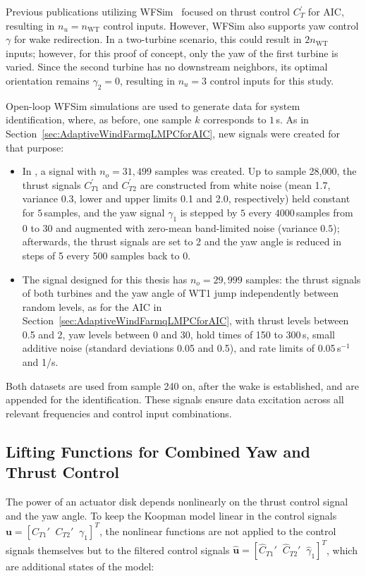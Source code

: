 Previous publications utilizing WFSim~\cite{boersma2017tutorial,doekemeijer2018online, sharan2022Koopman, dittmer2022data} focused on thrust control $C_T^{\prime}$ for AIC, resulting in $n_u = n_{\text{WT}}$ control inputs. However, WFSim also supports yaw control $\gamma$ for wake redirection. In a two-turbine scenario, this could result in $2n_{\text{WT}}$ inputs; however, for this proof of concept, only the yaw of the first turbine is varied. Since the second turbine has no downstream neighbors, its optimal orientation remains $\gamma_2 = 0$\textdegree{}, resulting in $n_u = 3$ control inputs for this study.

Open-loop WFSim simulations are used to generate data for system identification, where, as before, one sample $k$ corresponds to $1$\,s. As in Section~\ref{sec:AdaptiveWindFarmqLMPCforAIC}, new signals were created for that purpose:
\begin{itemize}
    \item In \cite{dittmer2023koopman}, a signal with $n_o = 31,499$ samples was created. Up to sample 28,000, the thrust signals $C_{T1}^{\prime}$ and $C_{T2}^{\prime}$ are constructed from white noise (mean 1.7, variance 0.3, lower and upper limits 0.1 and 2.0, respectively) held constant for $5$\,samples, and the yaw signal $\gamma_1$ is stepped by $5$\textdegree{} every $4000$\,samples from $0$\textdegree{} to $30$\textdegree{} and augmented with zero-mean band-limited noise (variance $0.5$\textdegree{}); afterwards, the thrust signals are set to 2 and the yaw angle is reduced in steps of 5\textdegree{} every 500 samples back to 0\textdegree{}. 
    \item The signal designed for this thesis has $n_o = 29,999$ samples: the thrust signals of both turbines and the yaw angle of WT1 jump independently between random levels, as for the AIC in Section~\ref{sec:AdaptiveWindFarmqLMPCforAIC}, with thrust levels between 0.5 and 2, yaw levels between 0\textdegree{} and 30\textdegree{}, hold times of 150 to 300\,s, small additive noise (standard deviations 0.05 and 0.5\textdegree{}), and rate limits of 0.05\,s$^{-1}$ and 1\textdegree/s.
\end{itemize}
 Both datasets are used from sample 240 on, after the wake is established, and are appended for the identification. These signals ensure data excitation across all relevant frequencies and control input combinations.

%
\subsection{Lifting Functions for Combined Yaw and Thrust Control}\label{sec:lifting functions for Combined Yaw and Thrust Control}
The power of an actuator disk depends nonlinearly on the thrust control signal and the yaw angle. To keep the Koopman model linear in the control signals $\bm{u} = [C_{T1}' \;\; C_{T2}' \;\; \gamma_1]^T$, the nonlinear functions are not applied to the control signals themselves but to the filtered control signals $\hat{\bm{u}} = [\hat{C}_{T1}' \;\; \hat{C}_{T2}' \;\; \hat{\gamma}_1]^T$, which are additional states of the model:

